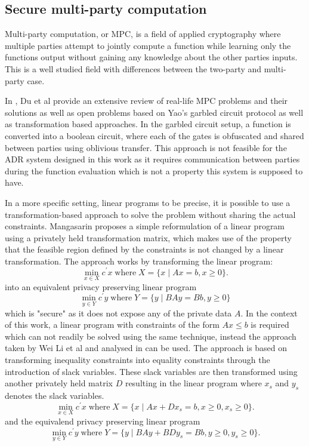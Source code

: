 \documentclass[12pt,msc,a4paper,oneside]{ucl_thesis}
\begin{document}
\subsection{Secure multi-party computation} \label{sec:background_linear_program}
Multi-party computation, or MPC, is a field of applied cryptography where multiple parties attempt to jointly compute a function while learning only the functions output without gaining any knowledge about the other parties inputs. This is a well studied field with differences between the two-party and multi-party case. \cite{goldreich1998secure}

In \cite{du2001secure}, Du et al provide an extensive review of real-life MPC problems and their solutions as well as open problems based on Yao's garbled circuit protocol \cite{yao1982protocols} as well as transformation based approaches. In the garbled circuit setup, a function is converted into a boolean circuit, where each of the gates is obfuscated and shared between parties using oblivious transfer. This approach is not feasible for the ADR system designed in this work as it requires communication between parties during the function evaluation which is not a property this system is supposed to have.

In a more specific setting, linear programs to be precise, it is possible to use a transformation-based approach to solve the problem without sharing the actual constraints. Mangasarin \cite{Mangasarian2012} proposes a simple reformulation of a linear program using a privately held transformation matrix, which makes use of the property that the feasible region defined by the constraints is not changed by a linear transformation. The approach works by transforming the linear program:
\begin{equation}
    \min_{x\in X}c^\prime x \;\textrm{where}\; X = \{x \mid Ax=b, x\geq0\}.
\end{equation}
into an equivalent privacy preserving linear program
\begin{equation}
    \min_{y\in Y}c^\prime y \;\textrm{where}\; Y = \{y \mid BAy=Bb, y\geq0\}
\end{equation}
which is "secure" as it does not expose any of the private data $A$. In the context of this work, a linear program with constraints of the form $Ax\leq b$ is required which can not readily be solved using the same technique, instead the approach taken by Wei Li et al \cite{Li2013} and analysed in \cite{vaidya2009privacy} can be used. The approach is based on transforming inequality constraints into equality constraints through the introduction of slack variables. These slack variables are then transformed using another privately held matrix $D$ resulting in the linear program where $x_s$ and $y_s$ denotes the slack variables.
\begin{equation}
    \min_{x\in X}c^\prime x \;\textrm{where}\; X = \{x \mid Ax + Dx_s = b, x\geq0, x_s\geq0\}.
\end{equation}
and the equivalend privacy preserving linear program
\begin{equation}
    \min_{y\in Y}c^\prime y \;\textrm{where}\; Y = \{y \mid BAy + BDy_s = Bb, y\geq0, y_s\geq0\}.
\end{equation}
\end{document}
